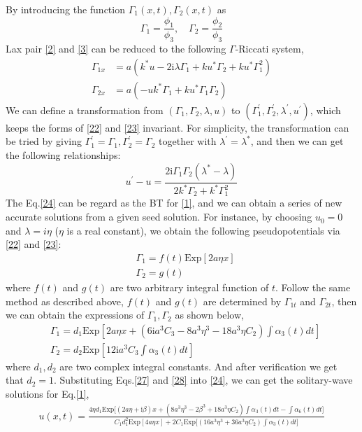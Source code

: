 \documentclass[12pt]{article}
\begin{document}
By introducing the function $\Gamma_{1}(x,t), \Gamma_{2}(x,t)$ as
\begin{equation}
  \Gamma_{1} = \frac{\phi_{1}}{\phi_{3}}, \quad \Gamma_{2} = \frac{\phi_{2}}{\phi_{3}}
\end{equation}
Lax pair \eqref{2} and \eqref{3} can be reduced to the following $\Gamma$-Riccati system,
\begin{align}
  \Gamma_{1x} &= a(k^{*}u - 2\mathrm{i}\lambda \Gamma_{1} + ku^{*}\Gamma_{2} + ku^{*}\Gamma_{1}^{2}) \label{22} \\
  \Gamma_{2x} &= a(-uk^{*}\Gamma_{1} + ku^{*}\Gamma_{1}\Gamma_{2})  \label{23}
\end{align}
We can define a transformation from $(\Gamma_{1}, \Gamma_{2}, \lambda, u)$ to $(\Gamma_{1}^{'}, \Gamma_{2}^{'}, \lambda^{'}, u^{'})$, which keeps the forms of \eqref{22} and \eqref{23} invariant. For simplicity, the transformation can be tried by giving $\Gamma_{1}^{'} = \Gamma_{1}, \Gamma_{2}^{'} = \Gamma_{2}$ together with $\lambda^{'} = \lambda^{*}$, and then we can get the following relationships:
\begin{equation}
  u^{'} - u = \frac{2\mathrm{i}\Gamma_{1}\Gamma_{2}(\lambda^{*}-\lambda)}{2k^{*}\Gamma_{2} + k^{*}\Gamma_{1}^{2}} \label{24}
\end{equation}
The Eq.\eqref{24} can be regard as the BT for \eqref{1}, and we can obtain a series of new accurate solutions from a given seed solution. For instance, by choosing $u_{0} = 0$ and $\lambda = i\eta$ ($\eta$ is a real constant), we obtain the following pseudopotentials via \eqref{22} and \eqref{23}:
\begin{align}
  & \Gamma_{1} = f(t)\mathrm{Exp}[2a\eta x] \\
  & \Gamma_{2} = g(t)
\end{align}
where $f(t)$ and $g(t)$ are two arbitrary integral function of $t$. Follow the same method as described above, $f(t)$ and $g(t)$ are determined by $\Gamma_{1t}$ and $\Gamma_{2t}$, then we can obtain the expressions of $\Gamma_{1}, \Gamma_{2}$ as shown below,
\begin{align}
  & \Gamma_{1} = d_{1}\mathrm{Exp}\left[2a\eta x + (6\mathrm{i}a^{3}C_{3} - 8a^{3}\eta^{3} - 18a^{3}\eta C_{2})\int \alpha_{3}(t)dt\right] \label{27}\\
  & \Gamma_{2} = d_{2}\mathrm{Exp}\left[12\mathrm{i}a^{3}C_{3}\int \alpha_{3}(t)dt\right] \label{28}
\end{align}
where $d_{1}, d_{2}$ are two complex integral constants. And after verification we get that $d_{2} = 1$. Substituting Eqs.\eqref{27} and \eqref{28} into \eqref{24}, we can get the solitary-wave solutions for Eq.\eqref{1},
\begin{align}
    u(x,t) = \frac{4\eta d_{1}\mathrm{Exp}\Big[(2a\eta+\mathrm{i}\beta)x + (8a^{3}\eta^{3} - 2\beta^{3} + 18a^{3}\eta C_{2})\int \alpha_{3}(t)dt - \int \alpha_{6}(t)dt\Big]}{C_{1}d_{1}^{2}\mathrm{Exp}[4a\eta x] + 2C_{1}\mathrm{Exp}\Big[(16a^{3}\eta^{3}+36a^{3}\eta C_{2})\int \alpha_{3}(t)dt\Big]}
\end{align}
\end{document}
